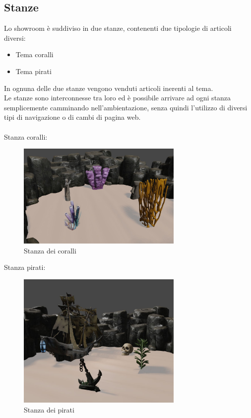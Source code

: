 \subsection{Stanze}
Lo showroom è suddiviso in due stanze, contenenti due tipologie di articoli diversi:
\begin{itemize}
	\item Tema coralli
	\item Tema pirati
\end{itemize}
In ognuna delle due stanze vengono venduti articoli inerenti al tema.\\
Le stanze sono interconnesse tra loro ed è possibile arrivare ad ogni stanza semplicemente camminando nell'ambientazione, senza quindi l'utilizzo di diversi tipi di navigazione o di cambi di pagina web.
\\\\
Stanza coralli:
\begin{figure}[H]
  \renewcommand{\thefigure}{10}
\begin{center}
  \includegraphics[width=8cm]{./res/images/coralli.jpeg}
\end{center}
  \caption{Stanza dei coralli}
  \label{Stanza dei coralli}
\end{figure}


Stanza pirati:
\begin{figure}[H]
  \renewcommand{\thefigure}{11}
\begin{center}
  \includegraphics[width=8cm]{./res/images/pirati.jpeg}
\end{center}
  \caption{Stanza dei pirati}
  \label{Stanza dei pirati}
\end{figure}
\pagebreak


